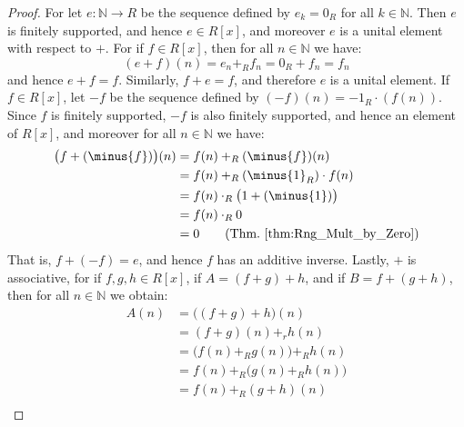 \documentclass{article}                                                        %
\begin{document}
        \begin{proof}
            For let $e:\mathbb{N}\rightarrow{R}$ be the sequence defined by
            $e_{k}=0_{R}$ for all $k\in\mathbb{N}$. Then $e$ is finitely
            supported, and hence $e\in{R}[x]$, and moreover $e$ is a unital
            element with respect to $+$. For if $f\in{R}[x]$, then for all
            $n\in\mathbb{N}$ we have:
            \begin{equation}
                (e+f)(n)=e_{n}+_{R}f_{n}=0_{R}+f_{n}=f_{n}
            \end{equation}
            and hence $e+f=f$. Similarly, $f+e=f$, and therefore $e$ is a unital
            element. If $f\in{R}[x]$, let $\minus{f}$ be the sequence
            defined by $(\minus{f})(n)=\minus{1}_{R}\cdot(f(n))$. Since $f$ is
            finitely supported, $\minus{f}$ is also finitely supported, and
            hence an element of $R[x]$, and moreover for all $n\in\mathbb{N}$
            we have:
            \begin{subequations}
                \begin{align}
                    \big(f+(\minus{f})\big)(n)&=f(n)+_{R}(\minus{f})(n)\\
                        &=f(n)+_{R}(\minus{1}_{R})\cdot{f}(n)\\
                        &=f(n)\cdot_{R}\big(1+(\minus{1})\big)\\
                        &=f(n)\cdot_{R}0\\
                        &=0\tag{Thm.~\ref{thm:Rng_Mult_by_Zero}}
                \end{align}
            \end{subequations}
            That is, $f+(\minus{f})=e$, and hence $f$ has an additive inverse.
            Lastly, $+$ is associative, for if $f,g,h\in{R}[x]$, if
            $A=(f+g)+h$, and if $B=f+(g+h)$, then for all $n\in\mathbb{N}$ we
            obtain:
            \begin{subequations}
                \begin{align}
                    A(n)&=\big((f+g)+h\big)(n)\\
                        &=(f+g)(n)+_{r}h(n)\\
                        &=\big(f(n)+_{R}g(n)\big)+_{R}h(n)\\
                        &=f(n)+_{R}\big(g(n)+_{R}h(n)\big)\\
                        &=f(n)+_{R}(g+h)(n)\\

\end{align}
\end{subequations}
\end{proof}
\end{document}
